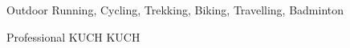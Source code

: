 



\begin{cvskills}
  \cvskill
    {Outdoor} %
    {Running, Cycling, Trekking, Biking, Travelling, Badminton} %

  \cvskill
    {Professional} %
    {KUCH KUCH} %

\end{cvskills}
